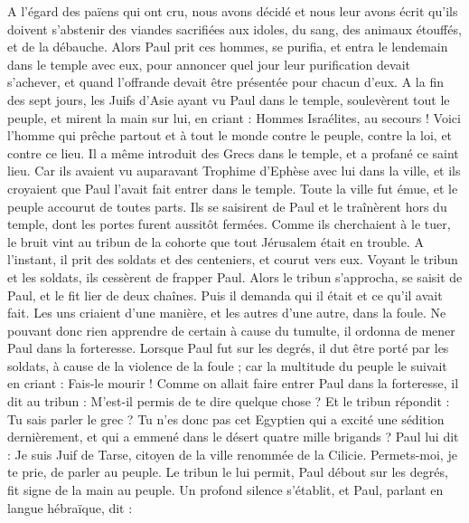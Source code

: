 \begin{multicols}{2}
A l'égard des païens qui ont cru, nous avons décidé et nous leur avons écrit qu’ils doivent s’abstenir des viandes sacrifiées aux idoles, du sang, des animaux étouffés, et de la débauche.
Alors Paul prit ces hommes, se purifia, et entra le lendemain dans le temple avec eux, pour annoncer quel jour leur purification devait s'achever, et quand l’offrande devait être présentée pour chacun d’eux.
A la fin des sept jours, les Juifs d'Asie ayant vu Paul dans le temple, soulevèrent tout le peuple, et mirent la main sur lui,
en criant : Hommes Israélites, au secours ! Voici l’homme qui prêche partout et à tout le monde contre le peuple, contre la loi, et contre ce lieu. Il a même introduit des Grecs dans le temple, et a profané ce saint lieu.
Car ils avaient vu auparavant Trophime d’Ephèse avec lui dans la ville, et ils croyaient que Paul l'avait fait entrer dans le temple.
Toute la ville fut émue, et le peuple accourut de toutes parts. Ils se saisirent de Paul et le traînèrent hors du temple, dont les portes furent aussitôt fermées.
Comme ils cherchaient à le tuer, le bruit vint au tribun de la cohorte que tout Jérusalem était en trouble.
A l’instant, il prit des soldats et des centeniers, et courut vers eux. Voyant le tribun et les soldats, ils cessèrent de frapper Paul.
Alors le tribun s’approcha, se saisit de Paul, et le fit lier de deux chaînes. Puis il demanda qui il était et ce qu’il avait fait.
Les uns criaient d'une manière, et les autres d'une autre, dans la foule. Ne pouvant donc rien apprendre de certain à cause du tumulte, il ordonna de mener Paul dans la forteresse.
Lorsque Paul fut sur les degrés, il dut être porté par les soldats, à cause de la violence de la foule ;
car la multitude du peuple le suivait en criant : Fais-le mourir !
Comme on allait faire entrer Paul dans la forteresse, il dit au tribun : M’est-il permis de te dire quelque chose ? Et le tribun répondit : Tu sais parler le grec ?
Tu n’es donc pas cet Egyptien qui a excité une sédition dernièrement, et qui a emmené dans le désert quatre mille brigands ?
Paul lui dit : Je suis Juif de Tarse, citoyen de la ville renommée de la Cilicie. Permets-moi, je te prie, de parler au peuple.
Le tribun le lui permit, Paul débout sur les degrés, fit signe de la main au peuple. Un profond silence s’établit, et Paul, parlant en langue hébraïque, dit :
\end{multicols}
